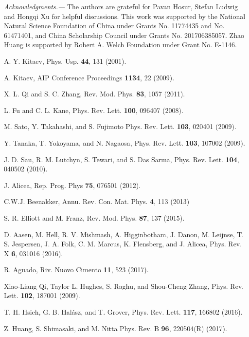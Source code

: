 \documentclass[aps,prl,twocolumn,showpacs,showpacs,10pt,superscriptaddress]{revtex4-1}
\begin{document}
\acknowledgments
{\it Acknowledgments.---}
The authors are grateful for Pavan Hosur, Stefan Ludwig and Hongqi Xu for helpful discussions. This work was supported by the National Natural Science Foundation of China under Grants No. 11774435 and No. 61471401, and China Scholarship Council under Grants No. 201706385057. Zhao Huang is supported by Robert A. Welch Foundation under Grant No. E-1146.

\begin{thebibliography}{00}

 A. Y. Kitaev, Phys. Usp. \textbf{44}, 131 (2001).

	A. Kitaev, AIP Conference Proceedings \textbf{1134}, 22 (2009).

 X. L. Qi and S. C. Zhang, Rev. Mod. Phys. \textbf{83}, 1057 (2011).


	L. Fu and C. L. Kane, Phys. Rev. Lett. \textbf{100}, 096407 (2008).

 M. Sato, Y. Takahashi, and S. Fujimoto Phys. Rev. Lett. \textbf{103}, 020401 (2009).

 Y. Tanaka, T. Yokoyama, and N. Nagaosa, Phys. Rev. Lett. \textbf{103}, 107002 (2009).

 J. D. Sau, R. M. Lutchyn, S. Tewari, and S. Das Sarma, Phys. Rev. Lett. \textbf{104}, 040502 (2010).

 J. Alicea, Rep. Prog. Phys \textbf{75}, 076501 (2012).

 C.W.J. Beenakker, Annu. Rev. Con. Mat. Phys. \textbf{4}, 113 (2013)

 S. R. Elliott and M. Franz, Rev. Mod. Phys. \textbf{87}, 137 (2015).

	D. Aasen, M. Hell, R. V. Mishmash, A. Higginbotham, J. Danon, M. Leijnse, T. S. Jespersen, J. A. Folk, C. M. Marcus, K. Flensberg, and J. Alicea, Phys. Rev. X \textbf{6}, 031016 (2016).


 R. Aguado, Riv. Nuovo Cimento \textbf{11}, 523 (2017).


 Xiao-Liang Qi, Taylor L. Hughes, S. Raghu, and Shou-Cheng Zhang, Phys. Rev. Lett. \textbf{102}, 187001 (2009).

 T. H. Hsieh, G. B. Hal\'asz, and T. Grover, Phys. Rev. Lett. \textbf{117}, 166802 (2016).

 Z. Huang, S. Shimasaki, and M. Nitta Phys. Rev. B \textbf{96}, 220504(R) (2017).









\end{thebibliography}
\end{document}
